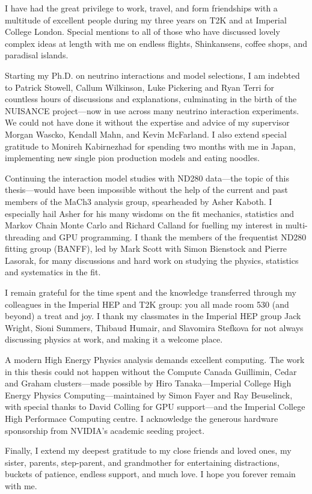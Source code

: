 \begin{acknowledgements}
	I have had the great privilege to work, travel, and form friendships with a multitude of excellent people during my three years on T2K and at Imperial College London. Special mentions to all of those who have discussed lovely complex ideas at length with me on endless flights, Shinkansens, coffee shops, and paradisal islands.
	
	Starting my Ph.D. on neutrino interactions and model selections, I am indebted to Patrick Stowell, Callum Wilkinson, Luke Pickering and Ryan Terri for countless hours of discussions and explanations, culminating in the birth of the NUISANCE project\cite{NUISANCE}---now in use across many neutrino interaction experiments. We could not have done it without the expertise and advice of my supervisor Morgan Wascko, Kendall Mahn, and Kevin McFarland. I also extend special gratitude to Monireh Kabirnezhad for spending two months with me in Japan, implementing new single pion production models and eating noodles.
  
	Continuing the interaction model studies with ND280 data---the topic of this thesis---would have been impossible without the help of the current and past members of the MaCh3 analysis group, spearheaded by Asher Kaboth. I especially hail Asher for his many wisdoms on the fit mechanics, statistics and Markov Chain Monte Carlo and Richard Calland for fuelling my interest in multi-threading and GPU programming. I thank the members of the frequentist ND280 fitting group (BANFF), led by Mark Scott with Simon Bienstock and Pierre Lasorak, for many discussions and hard work on studying the physics, statistics and systematics in the fit.
	
	I remain grateful for the time spent and the knowledge transferred through my colleagues in the Imperial HEP and T2K group: you all made room 530 (and beyond) a treat and joy. I thank my classmates in the Imperial HEP group Jack Wright, Sioni Summers, Thibaud Humair, and Slavomira Stefkova for not always discussing physics at work, and making it a welcome place.
	
	A modern High Energy Physics analysis demands excellent computing. The work in this thesis could not happen without the Compute Canada Guillimin, Cedar and Graham clusters---made possible by Hiro Tanaka---Imperial College High Energy Physics Computing---maintained by Simon Fayer and Ray Beuselinck, with special thanks to David Colling for GPU support---and the Imperial College High Performace Computing centre. I acknowledge the generous hardware sponsorship from NVIDIA's academic seeding project.
	
	Finally, I extend my deepest gratitude to my close friends and loved ones, my sister, parents, step-parent, and grandmother for entertaining distractions, buckets of patience, endless support, and much love. I hope you forever remain with me.
\end{acknowledgements}

\tableofcontents